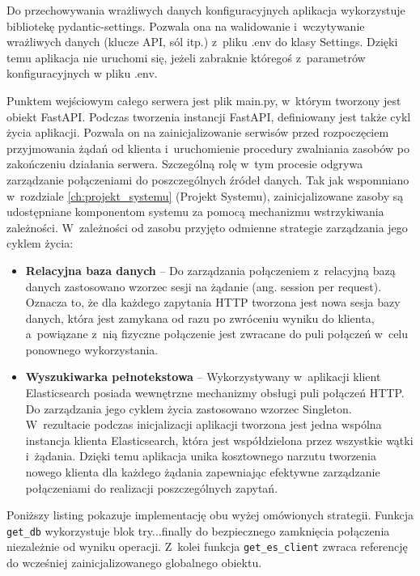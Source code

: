 Do przechowywania wrażliwych danych konfiguracyjnych aplikacja wykorzystuje bibliotekę pydantic-settings. 
Pozwala ona na walidowanie i~wczytywanie wrażliwych danych (klucze API, sól itp.) z~pliku .env do
klasy Settings. Dzięki temu aplikacja nie uruchomi się, jeżeli zabraknie któregoś z~parametrów konfiguracyjnych 
w pliku .env.

Punktem wejściowym całego serwera jest plik main.py, w~którym tworzony jest obiekt FastAPI. Podczas tworzenia instancji 
FastAPI, definiowany jest także cykl życia aplikacji. Pozwala on na zainicjalizowanie serwisów przed rozpoczęciem 
przyjmowania żądań od klienta i~uruchomienie procedury zwalniania zasobów po zakończeniu działania serwera. Szczególną rolę w~tym procesie 
odgrywa zarządzanie połączeniami do poszczególnych źródeł danych. Tak jak wspomniano w~rozdziale \ref{ch:projekt_systemu} (Projekt Systemu), zainicjalizowane 
zasoby są udostępniane komponentom systemu za pomocą mechanizmu wstrzykiwania zależności. W~zależności od zasobu 
przyjęto odmienne strategie zarządzania jego cyklem życia:
\begin{itemize}
    \item {\textbf{Relacyjna baza danych}} -- Do zarządzania połączeniem z~relacyjną bazą danych zastosowano wzorzec sesji na żądanie 
    (ang. session per request). Oznacza to, że dla każdego zapytania HTTP tworzona jest nowa sesja bazy danych, która jest zamykana od razu 
    po zwróceniu wyniku do klienta, a~powiązane z~nią fizyczne połączenie jest zwracane do puli połączeń w~celu ponownego wykorzystania.
    \item {\textbf{Wyszukiwarka pełnotekstowa}} -- Wykorzystywany w~aplikacji klient Elasticsearch posiada wewnętrzne mechanizmy obsługi 
    puli połączeń HTTP. Do zarządzania jego cyklem życia zastosowano wzorzec Singleton. W~rezultacie podczas inicjalizacji 
    aplikacji tworzona jest jedna wspólna instancja klienta Elasticsearch, która jest współdzielona przez wszystkie wątki i~żądania. Dzięki temu aplikacja unika 
    kosztownego narzutu tworzenia nowego klienta dla każdego żądania zapewniając efektywne zarządzanie połączeniami do realizacji poszczególnych zapytań.
\end{itemize}
Poniższy listing pokazuje implementację obu wyżej omówionych strategii. Funkcja \texttt{get\_db} wykorzystuje blok try...finally
do bezpiecznego zamknięcia połączenia niezależnie od wyniku operacji. Z~kolei funkcja \texttt{get\_es\_client} zwraca referencję do 
wcześniej zainicjalizowanego globalnego obiektu.

